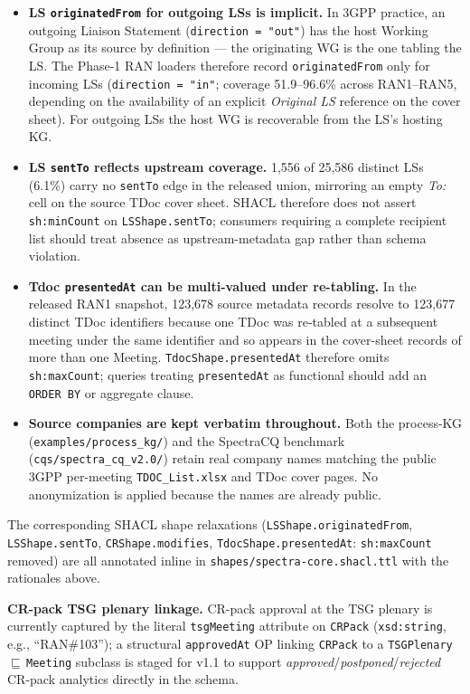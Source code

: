 \begin{itemize}
\item \textbf{LS \texttt{originatedFrom} for outgoing LSs is implicit.} In 3GPP practice, an outgoing Liaison Statement (\texttt{direction = "out"}) has the host Working Group as its source by definition --- the originating WG is the one tabling the LS. The Phase-1 RAN loaders therefore record \texttt{originatedFrom} only for incoming LSs (\texttt{direction = "in"}; coverage 51.9--96.6\% across RAN1--RAN5, depending on the availability of an explicit \emph{Original LS} reference on the cover sheet). For outgoing LSs the host WG is recoverable from the LS's hosting KG.
\item \textbf{LS \texttt{sentTo} reflects upstream coverage.} 1,556 of 25,586 distinct LSs (6.1\%) carry no \texttt{sentTo} edge in the released union, mirroring an empty \emph{To:} cell on the source TDoc cover sheet. SHACL therefore does not assert \texttt{sh:minCount} on \texttt{LSShape.\bk sentTo}; consumers requiring a complete recipient list should treat absence as upstream-metadata gap rather than schema violation.
\item \textbf{Tdoc \texttt{presentedAt} can be multi-valued under re-tabling.} In the released RAN1 snapshot, 123,678 source metadata records resolve to 123,677 distinct TDoc identifiers because one TDoc was re-tabled at a subsequent meeting under the same identifier and so appears in the cover-sheet records of more than one Meeting. \texttt{TdocShape.\bk presentedAt} therefore omits \texttt{sh:maxCount}; queries treating \texttt{presentedAt} as functional should add an \texttt{ORDER BY} or aggregate clause.
\item \textbf{Source companies are kept verbatim throughout.} Both the process-KG (\texttt{examples/\bk process\_\bk kg/}) and the SpectraCQ benchmark (\texttt{cqs/\bk spectra\_\bk cq\_v2.0/}) retain real company names matching the public 3GPP per-meeting \texttt{TDOC\_\bk List.\bk xlsx} and TDoc cover pages. No anonymization is applied because the names are already public.
\end{itemize}

\noindent The corresponding SHACL shape relaxations (\texttt{LSShape.originatedFrom}, \texttt{LSShape.sentTo}, \texttt{CRShape.modifies}, \texttt{TdocShape.presentedAt}: \texttt{sh:maxCount} removed) are all annotated inline in \texttt{shapes/\bk spectra-core.\bk shacl.\bk ttl} with the rationales above.

\noindent\textbf{CR-pack TSG plenary linkage.} CR-pack approval at the TSG plenary is currently captured by the literal \texttt{tsgMeeting} attribute on \texttt{CRPack} (\texttt{xsd:string}, e.g., ``RAN\#103''); a structural \texttt{approvedAt} OP linking \texttt{CRPack} to a \texttt{TSGPlenary}\,$\sqsubseteq$\,\texttt{Meeting} subclass is staged for v1.1 to support \emph{approved}/\emph{postponed}/\emph{rejected} CR-pack analytics directly in the schema.

